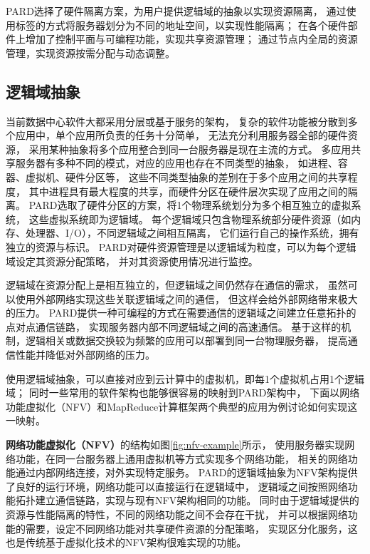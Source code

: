 PARD选择了硬件隔离方案，为用户提供逻辑域的抽象以实现资源隔离，
通过使用标签的方式将服务器划分为不同的地址空间，以实现性能隔离；
在各个硬件部件上增加了控制平面与可编程功能，实现共享资源管理；
通过节点内全局的资源管理，实现资源按需分配与动态调整。


\subsection{逻辑域抽象}

当前数据中心软件大都采用分层或基于服务的架构，
复杂的软件功能被分散到多个应用中，单个应用所负责的任务十分简单，
无法充分利用服务器全部的硬件资源，
采用某种抽象将多个应用整合到同一台服务器是现在主流的方式。
多应用共享服务器有多种不同的模式，对应的应用也存在不同类型的抽象，
如进程、容器、虚拟机、硬件分区\cite{LDom,IBM_LPAR:2007}等，
这些不同类型抽象的差别在于多个应用之间的共享程度，
其中进程具有最大程度的共享，而硬件分区在硬件层次实现了应用之间的隔离。
PARD选取了硬件分区的方案，将1个物理系统划分为多个相互独立的虚拟系统，
这些虚拟系统即为逻辑域。
每个逻辑域只包含物理系统部分硬件资源（如内存、处理器、I/O），不同逻辑域之间相互隔离，
它们运行自己的操作系统，拥有独立的资源与标识。
PARD对硬件资源管理是以逻辑域为粒度，可以为每个逻辑域设定其资源分配策略，
并对其资源使用情况进行监控。

逻辑域在资源分配上是相互独立的，但逻辑域之间仍然存在通信的需求，
虽然可以使用外部网络实现这些关联逻辑域之间的通信，
但这样会给外部网络带来极大的压力。%
PARD提供一种可编程的方式在需要通信的逻辑域之间建立任意拓扑的点对点通信链路，
实现服务器内部不同逻辑域之间的高速通信。
基于这样的机制，逻辑相关或数据交换较为频繁的应用可以部署到同一台物理服务器，
提高通信性能并降低对外部网络的压力。

使用逻辑域抽象，可以直接对应到云计算中的虚拟机，即每1个虚拟机占用1个逻辑域；
同时一些常用的软件架构也能够很容易的映射到PARD架构中，
下面以网络功能虚拟化（NFV）和MapReduce计算框架两个典型的应用为例讨论如何实现这一映射。

\textbf{网络功能虚拟化（NFV）}的结构如图\ref{fig:nfv-example}所示，
使用服务器实现网络功能，在同一台服务器上通用虚拟机等方式实现多个网络功能，
相关的网络功能通过内部网络连接，对外实现特定服务。
PARD的逻辑域抽象为NFV架构提供了良好的运行环境，网络功能可以直接运行在逻辑域中，
逻辑域之间按照网络功能拓扑建立通信链路，实现与现有NFV架构相同的功能。
同时由于逻辑域提供的资源与性能隔离的特性，不同的网络功能之间不会存在干扰，
并可以根据网络功能的需要，设定不同网络功能对共享硬件资源的分配策略，
实现区分化服务，这也是传统基于虚拟化技术的NFV架构很难实现的功能。

